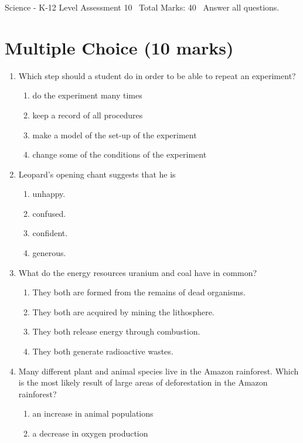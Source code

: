 \documentclass[12pt]{article}
\begin{document}
\begin{center}
Science - K-12 Level Assessment 10 \
Total Marks: 40 \
Answer all questions.
\end{center}

\section*{Multiple Choice (10 marks)}
\begin{enumerate}[label=\arabic*.]
\item Which step should a student do in order to be able to repeat an experiment?
\begin{enumerate}[label=(\alph*)]
    \item do the experiment many times
    \item keep a record of all procedures
    \item make a model of the set-up of the experiment
    \item change some of the conditions of the experiment
\end{enumerate}
\item Leopard's opening chant suggests that he is
\begin{enumerate}[label=(\alph*)]
    \item unhappy.
    \item confused.
    \item confident.
    \item generous.
\end{enumerate}
\item What do the energy resources uranium and coal have in common?
\begin{enumerate}[label=(\alph*)]
    \item They both are formed from the remains of dead organisms.
    \item They both are acquired by mining the lithosphere.
    \item They both release energy through combustion.
    \item They both generate radioactive wastes.
\end{enumerate}
\item Many different plant and animal species live in the Amazon rainforest. Which is the most likely result of large areas of deforestation in the Amazon rainforest?
\begin{enumerate}[label=(\alph*)]
    \item an increase in animal populations
    \item a decrease in oxygen production

\end{enumerate}
\end{enumerate}
\end{document}
